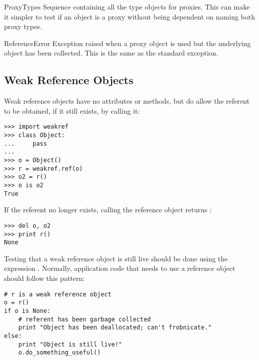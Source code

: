 \begin{datadesc}{ProxyTypes}
  Sequence containing all the type objects for proxies.  This can make
  it simpler to test if an object is a proxy without being dependent
  on naming both proxy types.
\end{datadesc}

\begin{excdesc}{ReferenceError}
  Exception raised when a proxy object is used but the underlying
  object has been collected.  This is the same as the standard
   exception.
\end{excdesc}


\begin{seealso}
\end{seealso}


\subsection{Weak Reference Objects
            \label{weakref-objects}}

Weak reference objects have no attributes or methods, but do allow the
referent to be obtained, if it still exists, by calling it:

\begin{verbatim}
>>> import weakref
>>> class Object:
...     pass
...
>>> o = Object()
>>> r = weakref.ref(o)
>>> o2 = r()
>>> o is o2
True
\end{verbatim}

If the referent no longer exists, calling the reference object returns
:

\begin{verbatim}
>>> del o, o2
>>> print r()
None
\end{verbatim}

Testing that a weak reference object is still live should be done
using the expression .  Normally,
application code that needs to use a reference object should follow
this pattern:

\begin{verbatim}
# r is a weak reference object
o = r()
if o is None:
    # referent has been garbage collected
    print "Object has been deallocated; can't frobnicate."
else:
    print "Object is still live!"
    o.do_something_useful()
\end{verbatim}

